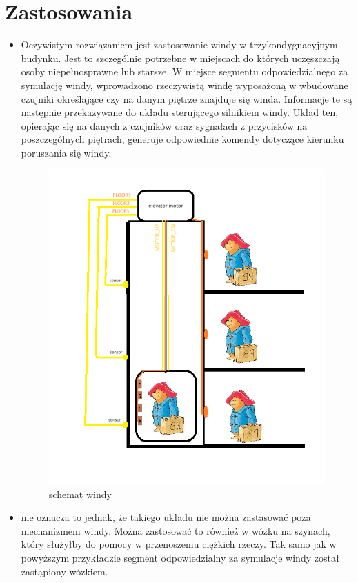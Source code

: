 \documentclass[a4paper]{article}
\begin{document}
\section{Zastosowania}
\begin{itemize}
    \item Oczywistym rozwiązaniem jest zastosowanie windy w trzykondygnacyjnym budynku. Jest to szczególnie potrzebne w miejscach do których uczęszczają osoby niepełnosprawne lub starsze.
 W miejsce segmentu odpowiedzialnego za symulację windy,
  wprowadzono rzeczywistą windę wyposażoną w wbudowane czujniki określające czy na danym piętrze znajduje się winda.
     Informacje te są następnie przekazywane do układu sterującego silnikiem windy.
      Układ ten, opierając się na danych z czujników oraz sygnałach z przycisków na poszczególnych piętrach,
       generuje odpowiednie komendy dotyczące kierunku poruszania się windy.
       
       \begin{figure}[H]
        \centering
        \includegraphics[width=\textwidth]{elevator.png}
        \caption{schemat windy}
    \end{figure}
    \item nie oznacza to jednak, że takiego układu nie można zastasować poza mechanizmem windy. Można zastosować to również w wózku na szynach,
 który służyłby do pomocy w przenoszeniu ciężkich rzeczy. Tak samo jak w powyższym przykładzie segment odpowiedzialny za symulacje windy został zastąpiony wózkiem.
\end{itemize}
\end{document}
